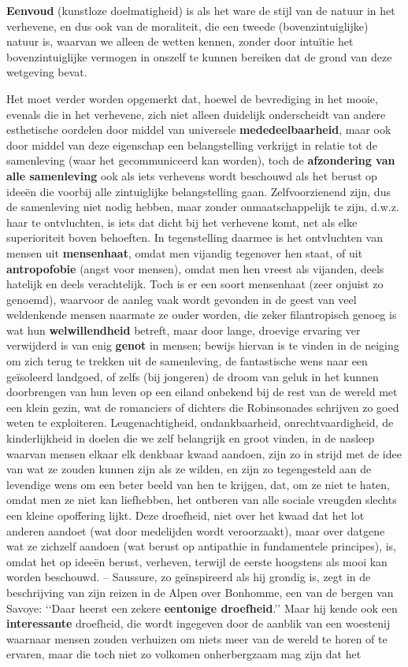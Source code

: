 \textbf{Eenvoud} (kunstloze doelmatigheid) is als het ware de stijl van de natuur in het verhevene, en dus ook van de moraliteit, die een tweede (bovenzintuiglijke) natuur is, waarvan we alleen de wetten kennen, zonder door intuïtie het bovenzintuiglijke vermogen in onszelf te kunnen bereiken dat de grond van deze wetgeving bevat.

Het moet verder worden opgemerkt dat, hoewel de bevrediging in het mooie, evenals die in het verhevene, zich niet alleen duidelijk onderscheidt van andere esthetische oordelen door middel van universele \textbf{mededeelbaarheid}, maar ook door middel van deze eigenschap een belangstelling verkrijgt in relatie tot de samenleving (waar het gecommuniceerd kan worden), toch de \textbf{afzondering van alle samenleving} ook als iets verhevens wordt beschouwd als het berust op ideeën die voorbij alle zintuiglijke belangstelling gaan. Zelfvoorzienend zijn, dus de samenleving niet nodig hebben, maar zonder onmaatschappelijk te zijn, d.w.z. haar te ontvluchten, is iets dat dicht bij het verhevene komt, net als elke superioriteit boven behoeften. In tegenstelling daarmee is het ontvluchten van mensen uit \textbf{mensenhaat}, omdat men vijandig tegenover hen staat, of uit \textbf{antropofobie} (angst voor mensen), omdat men hen vreest als vijanden, deels hatelijk en deels verachtelijk. Toch is er een soort mensenhaat (zeer onjuist zo genoemd), waarvoor de aanleg vaak wordt gevonden in de geest van veel weldenkende mensen naarmate ze ouder worden, die zeker filantropisch genoeg is wat hun \textbf{welwillendheid} betreft, maar door lange, droevige ervaring ver verwijderd is van enig \textbf{genot} in mensen; bewijs hiervan is te vinden in de neiging om zich terug te trekken uit de samenleving, de fantastische wens naar een geïsoleerd landgoed, of zelfs (bij jongeren) de droom van geluk in het kunnen doorbrengen van hun leven op een eiland onbekend bij de rest van de wereld met een klein gezin, wat de romanciers of dichters die Robinsonades schrijven zo goed weten te exploiteren. Leugenachtigheid, ondankbaarheid, onrechtvaardigheid, de kinderlijkheid in doelen die we zelf belangrijk en groot vinden, in de nasleep waarvan mensen elkaar elk denkbaar kwaad aandoen, zijn zo in strijd met de idee van wat ze zouden kunnen zijn als ze wilden, en zijn zo tegengesteld aan de levendige wens om een beter beeld van hen te krijgen, dat, om ze niet te haten, omdat men ze niet kan liefhebben, het ontberen van alle sociale vreugden slechts een kleine opoffering lijkt. Deze droefheid, niet over het kwaad dat het lot anderen aandoet (wat door medelijden wordt veroorzaakt), maar over datgene wat ze zichzelf aandoen (wat berust op antipathie in fundamentele principes), is, omdat het op ideeën berust, verheven, terwijl de eerste hoogstens als mooi kan worden beschouwd. – Saussure, zo geïnspireerd als hij grondig is, zegt in de beschrijving van zijn reizen in de Alpen over Bonhomme, een van de bergen van Savoye: ‘‘Daar heerst een zekere \textbf{eentonige droefheid}.’’ Maar hij kende ook een \textbf{interessante} droefheid, die wordt ingegeven door de aanblik van een woestenij waarnaar mensen zouden verhuizen om niets meer van de wereld te horen of te ervaren, maar die toch niet zo volkomen onherbergzaam mag zijn dat het 